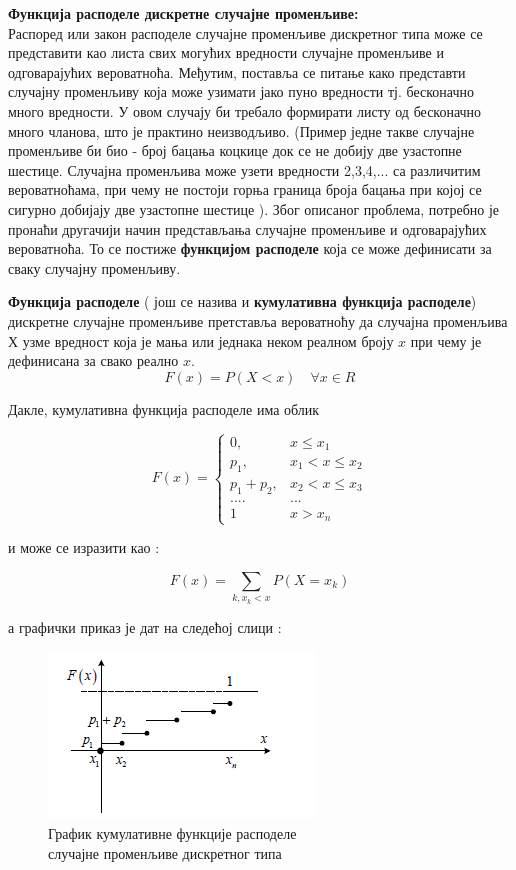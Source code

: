 \textbf{Функција расподеле дискретне случајне 
променљиве:}
\\

Распоред или закон расподеле случајне променљиве дискретног типа може се представити као листа свих могућих вредности случајне променљиве и одговарајућих вероватноћа. Међутим, поставља се питање како представти случајну променљиву која може узимати јако пуно вредности тј. бесконачно много вредности. У овом случају би требало формирати листу од бесконачно много чланова, што је практино неизводљиво. (Пример једне такве случајне променљиве би био - број бацања коцкице док се не добију две узастопне шестице. Случајна променљива може узети вредности 2,3,4,... са различитим вероватноћама, при чему не постоји горња граница броја бацања при којој се сигурно добијају две узастопне шестице ).
Због описаног проблема, потребно је пронаћи другачији начин представљања случајне променљиве и одговарајућих вероватноћа. То се постиже \textbf{функцијом расподеле} која се може дефинисати за сваку случајну променљиву.

\begin{de}
\textbf{Функција расподеле} ( још се назива и \textbf{кумулативна функција расподеле}) дискретне случајне променљиве претставља вероватноћу да случајна променљива Х узме вредност која је мања или једнака неком реалном броју $x$ при чему је дефинисана за свако реално   $x$. 
$$ F(x) = P (X<x) \quad \forall x \in R $$
\end{de}

Дакле, кумулативна функција расподеле има облик

$$
F(x) = \left\lbrace
\begin{array}{rl}
0, & x \leq x_1 \\
p_1, & x_1 < x \leq x_2 \\
p_1 + p_2, & x_2 < x \leq x_3 \\
.... & ... \\
1 & x > x_n
\end{array}
\right.
$$

и може се изразити као :

$$
F(x) = \sum_{k,x_k<x} P(X = x_k)
$$

а графички приказ је дат на следећој слици :


\begin{figure}[H]
    \centering
\captionsetup{justification=centering}
   \includegraphics[scale=0.8]{./Slike/slika14.png} 
	\caption{График кумулативне функције расподеле \\ случајне променљиве дискретног типа} 
	\label{fig:slika13}
\end{figure}

